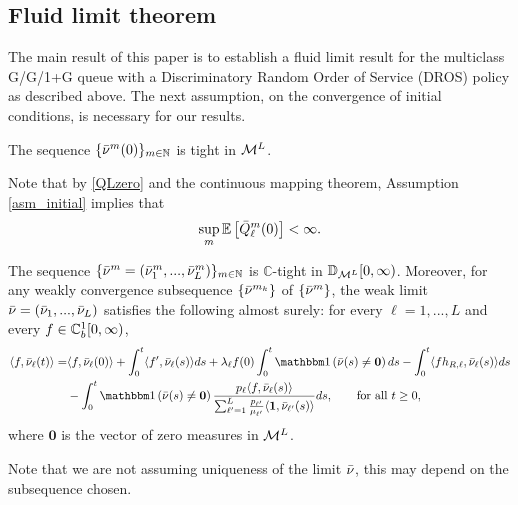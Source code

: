 \documentclass[stsy]{informs-stsy}
\begin{document}
\subsection{Fluid limit theorem}

The main result of this paper is to establish a fluid limit 
result %
for the multiclass G/G/1+G queue with a Discriminatory Random Order of Service (DROS) policy as described above. The next assumption, on the convergence of initial conditions, is necessary for our results. 

\begin{assumption}\label{asm_initial}
The sequence $\{\bar{\nu}^m(0)\}_{m\in\mathbb{N}}$ is tight in $\mathcal{M}^L$.
\end{assumption}
Note that by \eqref{QLzero} and the continuous mapping theorem, Assumption \ref{asm_initial} implies that
\begin{equation}\label{Q0_bound}
\sup_m \mathbb{E}\left[\bar {Q}^m_\ell(0)\right]<\infty.
\end{equation}




\begin{theorem}\label{thm_conv}
The sequence $\{\bar{\nu}^m=(\bar{\nu}_1^m,...,\bar{\nu}_L^m)\}_{m\in\mathbb{N}}$ is $\mathbb{C}$-tight in $\mathbb{D}_{\mathcal{M}^L}[0,\infty)$. Moreover, for any weakly convergence subsequence 
$\{\bar{\nu}^{m_k}\}$ of $\{\bar{\nu}^m\}$, the weak limit  $\bar{\nu}=(\bar{\nu}_1,...,\bar{\nu}_L)$ satisfies the following almost surely: for every $\ell=1,...,L$ and every $f\in\mathbb{C}_b^{1}[0,\infty)$,
\begin{align}\label{fluid_eq}
  \langle f,\bnu_\ell(t)\rangle  = & \langle f,\bnu_\ell(0)\rangle + \int_0^t\langle f' ,\bnu_\ell(s)\rangle ds +\lambda_\ell f(0)\int_0^t\indic{\bar\nu(s)\neq\mathbf{0}}ds - \int_0^t\langle fh_{R,\ell},\bnu_\ell(s)\rangle ds \\
  &- \int_0^t\indic{\bar\nu(s)\neq \mathbf{0}}\frac{\weight_\ell\langle f,\bnu_\ell(s)\rangle}{\sum_{\ell'=1}^{L}\frac{\weight_{\ell'}}{\mu_{\ell'}}\langle\f1,\bnu_{\ell'}(s)\rangle} ds,\notag\quad\quad \text{for all }t\geq0,
\end{align}
where $\mathbf{0}$ is the vector of zero measures in $\mathcal{M}^L$.
\end{theorem}

\begin{remark}
Note that we are not assuming uniqueness of the limit $\bar{\nu}$, this may depend on the  subsequence chosen.
\end{remark}
\end{document}
